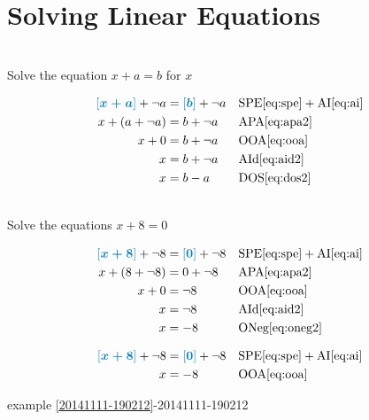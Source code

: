 
\section{Solving Linear Equations}\label{Solving Linear Equations}

\begin{example}[id:20141206-102142] \label{20141206-102142} \hfill \\

Solve the equation $x+a=b$ for $x$

\soln

\solnsteps
\begin{align*}
\farg{x+a} + \neg a  &= \farg{b} + \neg a  && \text{SPE} \eqref{eq:spe} + \text{AI} \eqref{eq:ai} \\
x + (a+\neg a) &= b + \neg a  && \text{APA} \eqref{eq:apa2} \\ 
x + 0 &= b + \neg a  && \text{OOA} \eqref{eq:ooa} \\
x &= b + \neg a  && \text{AId} \eqref{eq:aid2} \\
x &= b-a  && \text{DOS} \eqref{eq:dos2} 
\end{align*}
\end{example}


\begin{example}[id:20141111-222931] \label{20141111-222931} \hfill \\

Solve the equations $x+8=0$

\soln

\solnsteps
\begin{align*}
\farg{x+8}+\neg 8 &= \farg{0}+\neg 8 && \text{SPE} \eqref{eq:spe} + \text{AI} \eqref{eq:ai} \\
x+(8+\neg 8) &= 0 + \neg 8 && \text{APA} \eqref{eq:apa2} \\
x+0 &= \neg 8 && \text{OOA} \eqref{eq:ooa} \\
x &= \neg 8 && \text{AId} \eqref{eq:aid2} \\
x &= -8 && \text{ONeg} \eqref{eq:oneg2} 
\end{align*}

\soln

\lesssteps
\begin{align*}
\farg{x+8}+\neg 8 &= \farg{0}+\neg 8 && \text{SPE} \eqref{eq:spe} + \text{AI} \eqref{eq:ai} \\
x &= - 8 && \text{OOA} \eqref{eq:ooa} 
\end{align*}

\qdepend 

\qdependlist

example \ref{20141111-190212}-20141111-190212

\end{example}

